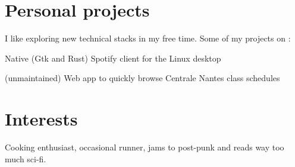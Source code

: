 \documentclass{cv}
\begin{document}
\section{Personal projects}

I like exploring new technical stacks in my free time. Some of my projects on \href{https://github.com/xou816}{} :

\begin{description}[leftmargin=!,labelwidth=2cm]
	\item[spot {\footnotesize(\faStar{}890)}] Native (Gtk and Rust) Spotify client for the Linux desktop
	\item[edt-ecn] (unmaintained) Web app to quickly browse Centrale Nantes class schedules
\end{description}
	
\section{Interests}
	
Cooking enthusiast, occasional runner, jams to post-punk and reads way too much sci-fi. 
\end{document}
